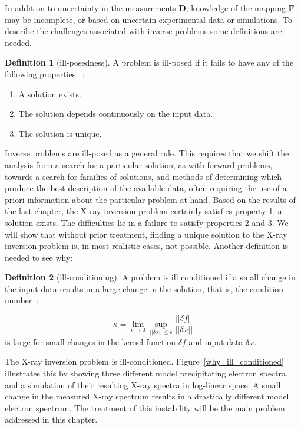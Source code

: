  In addition to uncertainty in the measurements $\mathbf{D}$, knowledge of the mapping $\mathbf{F}$ may be incomplete, or based on uncertain experimental data or simulations. To describe the challenges associated with inverse problems some definitions are needed.

\theoremstyle{definition}
\newtheorem{definition}{Definition}[section]
\begin{definition}[ill-posedness]
A problem is ill-posed if it fails to have any of the following properties~\citep{HADAMARD1902} : 
\begin{enumerate}
    \item A solution exists.
    \item The solution depends continuously on the input data.
    \item The solution is unique.
\end{enumerate}
\end{definition}

Inverse problems are ill-posed as a general rule. This requires that we shift the analysis from a search for a particular solution, as with forward problems, towards a search for families of solutions, and methods of determining which produce the best description of the available data, often requiring the use of a-priori information about the particular problem at hand. Based on the results of the last chapter, the X-ray inversion problem certainly satisfies property 1,  a solution exists. The difficulties lie in a failure to satisfy properties 2 and 3. We will show that without prior treatment, finding a unique solution to the X-ray inversion problem is, in most realistic cases, not possible. Another definition is needed to see why:

\begin{definition}[ill-conditioning]
A problem is ill conditioned if a small change in the input data results in a large change in the solution, that is, the condition number~\citep{Rice1966}:

$$\kappa = \lim_{\epsilon \to 0} \sup_{\vert\vert \delta x \vert \vert \leq \epsilon} \frac{\vert\vert \delta f \vert\vert}{\vert\vert \delta x \vert\vert}$$
is large for small changes in the kernel function $\delta f$ and input data $\delta x$.
\end{definition}

 The X-ray inversion problem is ill-conditioned. Figure~\ref{why_ill_conditioned} illustrates this by showing three different model precipitating electron spectra, and a simulation of their resulting X-ray spectra in log-linear space. A small change in the measured X-ray spectrum results in a drastically different model electron spectrum. The treatment of this instability will be the main problem addressed in this chapter. 

